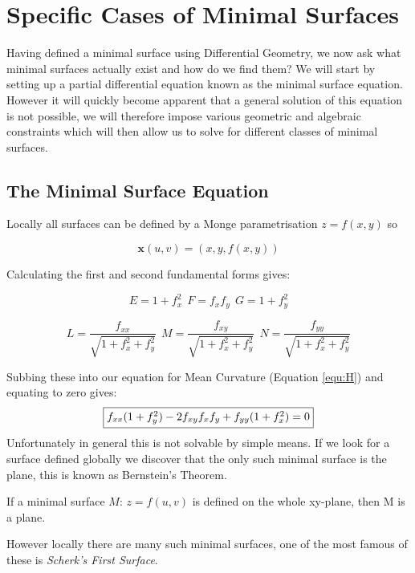 \section{Specific Cases of Minimal Surfaces}
Having defined a minimal surface using Differential Geometry, we now ask what minimal surfaces actually exist and how do we find them? We will start by setting up a partial differential equation known as the minimal surface equation. However it will quickly become apparent that a general solution of this equation is not possible, we will therefore impose various geometric and algebraic constraints which will then allow us to solve for different classes of minimal surfaces.

\subsection{The Minimal Surface Equation}
Locally all surfaces can be defined by a Monge parametrisation  $z= f(x,y)$ so

\begin{displaymath}
\mathbf x(u,v) = (x, y, f(x,y))
\end{displaymath}

Calculating the first and second fundamental forms gives:

\begin{displaymath}
E = 1 + f_x^2 \ \ F = f_xf_y \ \ G = 1+f_y^2
\end{displaymath}

\begin{displaymath}
L = \frac{f_{xx}}{\sqrt{1+f_x^2+f_y^2}} \ \ M = \frac{f_{xy}}{\sqrt{1+f_x^2+f_y^2}} \ \ N = \frac{f_{yy}}{\sqrt{1+f_x^2+f_y^2}}
\end{displaymath}

Subbing these into our equation for Mean Curvature (Equation \ref{equ:H}) and equating to zero gives:
\begin{equation}
\framebox{$f_{xx}(1+f_y^2)-2f_{xy}f_xf_y+f_{yy}(1+f_x^2)=0$}
\label{equ:MinimalSurfaceEquation}
\end{equation}
Unfortunately in general this is not solvable by simple means. If we look for a surface defined globally we discover that the only such minimal surface is the plane, this is known as Bernstein's Theorem.
\begin{theorem}[Bernstein]
If a minimal surface $M: \, z=f(u,v)$ is defined on the whole xy-plane, then M is a plane.
\end{theorem}

However locally there are many such minimal surfaces, one of the most famous of these is \emph{Scherk's First Surface}.

